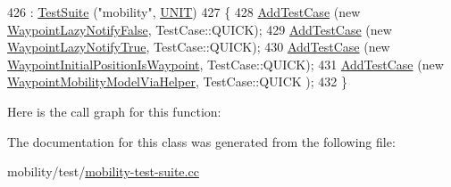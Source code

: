 \begin{DoxyCode}
426   : \hyperlink{classns3_1_1TestSuite_a904b0c40583b744d30908aeb94636d1a}{TestSuite} (\textcolor{stringliteral}{"mobility"}, \hyperlink{classns3_1_1TestSuite_a1ebfcab34ec8161e085e8e3a1855eae0a3885375a3787abf60431f8454b3cadbd}{UNIT})
427 \{
428   \hyperlink{classns3_1_1TestCase_a3718088e3eefd5d6454569d2e0ddd835}{AddTestCase} (\textcolor{keyword}{new} \hyperlink{classWaypointLazyNotifyFalse}{WaypointLazyNotifyFalse}, TestCase::QUICK);
429   \hyperlink{classns3_1_1TestCase_a3718088e3eefd5d6454569d2e0ddd835}{AddTestCase} (\textcolor{keyword}{new} \hyperlink{classWaypointLazyNotifyTrue}{WaypointLazyNotifyTrue}, TestCase::QUICK);
430   \hyperlink{classns3_1_1TestCase_a3718088e3eefd5d6454569d2e0ddd835}{AddTestCase} (\textcolor{keyword}{new} \hyperlink{classWaypointInitialPositionIsWaypoint}{WaypointInitialPositionIsWaypoint}, 
      TestCase::QUICK);
431   \hyperlink{classns3_1_1TestCase_a3718088e3eefd5d6454569d2e0ddd835}{AddTestCase} (\textcolor{keyword}{new} \hyperlink{classWaypointMobilityModelViaHelper}{WaypointMobilityModelViaHelper}, TestCase::QUICK
      );
432 \}
\end{DoxyCode}


Here is the call graph for this function\+:




The documentation for this class was generated from the following file\+:\begin{DoxyCompactItemize}
\item 
mobility/test/\hyperlink{mobility-test-suite_8cc}{mobility-\/test-\/suite.\+cc}\end{DoxyCompactItemize}
